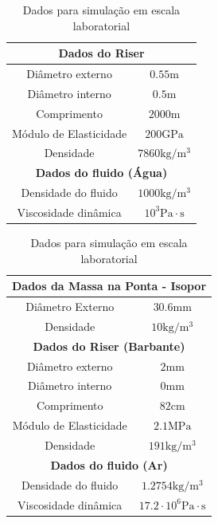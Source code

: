 \begin{table}[!ht]
\parbox{.45\linewidth}{
\centering
\caption{Dados para simulação em escala real\label{escalaReal} \cite{redytton}}
	\begin{tabular}{|c|c|}
	\hline
		\multicolumn{2}{|c|}{\textbf{Dados do Riser}}\\ \hline
		Diâmetro externo & $0.55\mathrm{m}$\\ \hline
		Diâmetro interno & $0.5\mathrm{m}$ \\ \hline
		Comprimento & $2000\mathrm{m}$ \\ \hline
		Módulo de Elasticidade & $200 \mathrm{GPa}$\\ \hline
		Densidade &  $7860\mathrm{kg}/\mathrm{m}^3$\\ \hline
		\multicolumn{2}{|c|}{\textbf{Dados do fluido (Água)}}\\ \hline
		Densidade do fluido &  $1000\mathrm{kg}/\mathrm{m}^3$\\ \hline
		Viscosidade dinâmica & $10^3 \mathrm{Pa}\cdot \mathrm{s}$ \\ \hline
	\end{tabular}
}
\hfill
\parbox{.45\linewidth}{
	\caption{Dados para simulação em escala laboratorial\label{escalaLaboratorial}}
	\centering
	\begin{tabular}{|c|c|}
		\hline
			\multicolumn{2}{|c|}{\textbf{Dados da Massa na Ponta - Isopor}} \\ \hline
			Diâmetro Externo & $30.6\mathrm{mm}$\\ \hline
			Densidade & $10\mathrm{kg}/\mathrm{m}^3$ \\ \hline
			\multicolumn{2}{|c|}{\textbf{Dados do Riser (Barbante)}}\\ \hline
			Diâmetro externo & $2\mathrm{mm}$\\ \hline
			Diâmetro interno & $0\mathrm{mm}$ \\ \hline
			Comprimento & $82\mathrm{cm}$ \\ \hline
			Módulo de Elasticidade & $2.1 \mathrm{MPa}$\\ \hline
			Densidade &  $191\mathrm{kg}/\mathrm{m}^3$\\ \hline
			\multicolumn{2}{|c|}{\textbf{Dados do fluido (Ar)}}\\ \hline
			Densidade do fluido &  $1.2754\mathrm{kg}/\mathrm{m}^3$\\ \hline
			Viscosidade dinâmica & $17.2\cdot 10^6 \mathrm{Pa}\cdot \mathrm{s}$ \\ \hline
		\end{tabular}
}

\end{table}

